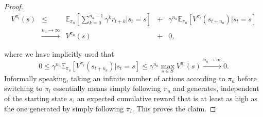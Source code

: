 \documentclass[11pt]{article} %
\begin{document}
\begin{proof}
	\[
		\begin{array}{rclcl}
			V^{\pi_l}(s) & \le & \mathbb{E}_{\pi_u}[\sum_{k=0}^{n_a-1} \gamma^k r_{t+k} | s_t = s] & + & \gamma^{n_a} \mathbb{E}_{\pi_u}[V^{\pi_l}(s_{t+{n_a}}) | s_t = s ] \\
						& \overset{n_a \rightarrow \infty}{\rightarrow } & V^{\pi_u}(s) & + & 0,
		\end{array}
	\]

	where we have implicitly used that $$0 \le \gamma^{n_a}\mathbb{E}_{\pi_u}[V^{\pi_l}(s_{t+n_a}) | s_t = s] \le \gamma^{n_a} \max_{s \in S} V^{\pi_l}(s) \overset{n_a \rightarrow \infty}{\rightarrow} 0.$$ Informally speaking, taking an infinite number of actions according to $\pi_u$ before switching to $\pi_l$ essentially means simply following $\pi_u$ and generates, independent of the starting state $s$, an expected cumulative reward that is at least as high as the one generated by simply following $\pi_l$. This proves the claim.

\end{proof}
\end{document}
